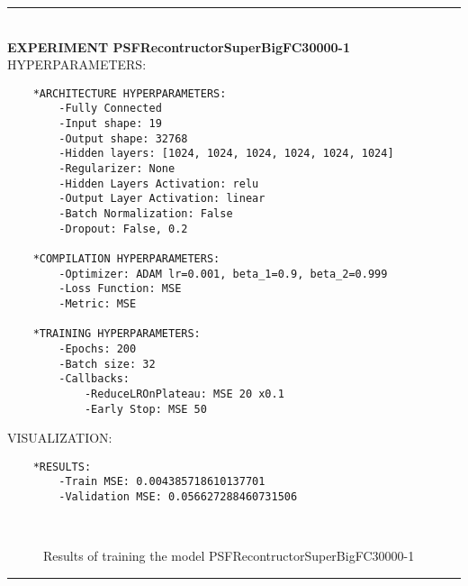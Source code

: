 \rule{0.5\textwidth}{0.5pt}\\

	{\large \textbf{EXPERIMENT PSFRecontructorSuperBigFC30000-1}}\\
	
	{\normalsize HYPERPARAMETERS:}
	\begin{lstlisting}	
	*ARCHITECTURE HYPERPARAMETERS:
		-Fully Connected
		-Input shape: 19
		-Output shape: 32768
		-Hidden layers: [1024, 1024, 1024, 1024, 1024, 1024]
		-Regularizer: None
		-Hidden Layers Activation: relu
		-Output Layer Activation: linear
		-Batch Normalization: False
		-Dropout: False, 0.2
	
	*COMPILATION HYPERPARAMETERS:
		-Optimizer: ADAM lr=0.001, beta_1=0.9, beta_2=0.999
		-Loss Function: MSE
		-Metric: MSE
	
	*TRAINING HYPERPARAMETERS:
		-Epochs: 200
		-Batch size: 32
		-Callbacks: 
			-ReduceLROnPlateau: MSE 20 x0.1
			-Early Stop: MSE 50
	\end{lstlisting}
	
	{\normalsize VISUALIZATION:}
	\begin{lstlisting}
	*RESULTS:
        -Train MSE: 0.004385718610137701
        -Validation MSE: 0.056627288460731506
	\end{lstlisting}
	
	\begin{figure*}[ht!]
		\hspace{\fill}
		\hspace{\fill}
		\\
		\caption{Results of training the model PSFRecontructorSuperBigFC30000-1}
	\end{figure*}
	
\FloatBarrier	
\rule{0.5\textwidth}{0.5pt}\\